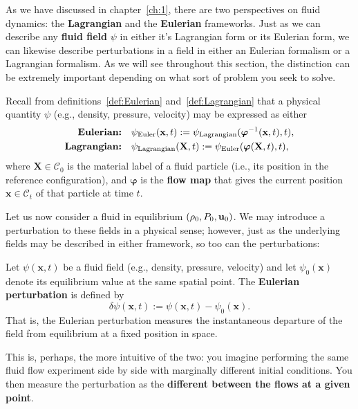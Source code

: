 As we have discussed in chapter~\ref{ch:1}, there are two perspectives on fluid dynamics: the \textbf{Lagrangian} and the \textbf{Eulerian} frameworks. Just as we can describe any \textbf{fluid field} $\psi$ in either it's Lagrangian form or its Eulerian form, we can likewise describe perturbations in a field in either an Eulerian formalism or a Lagrangian formalism. As we will see throughout this section, the distinction can be extremely important depending on what sort of problem you seek to solve.
\par
Recall from definitions~\ref{def:Eulerian} and~\ref{def:Lagrangian} that a physical quantity \( \psi \) (e.g., density, pressure, velocity) may be expressed as either
\[
\begin{aligned}
    \textbf{Eulerian:} \quad & \psi_{\rm Euler}(\mathbf{x}, t) := \psi_{\rm Lagrangian}(\boldsymbol{\varphi}^{-1}({\bf x},t),t), \\
    \textbf{Lagrangian:} \quad & \psi_{\rm Lagrangian}(\mathbf{X}, t) := \psi_{\rm Euler}(\boldsymbol{\varphi}(\mathbf{X}, t), t),
\end{aligned}
\]
where \( \mathbf{X} \in \mathcal{C}_0 \) is the material label of a fluid particle (i.e., its position in the reference configuration), and \( \boldsymbol{\varphi} \) is the \textbf{flow map} that gives the current position \( \mathbf{x} \in \mathcal{C}_t \) of that particle at time \( t \).
\par
Let us now consider a fluid in equilibrium $(\rho_0,P_0, {\bf u}_0)$. We may introduce a perturbation to these fields in a physical sense; however, just as the underlying fields may be described in either framework, so too can the perturbations:
\vspace{0.5cm}
\begin{definition}
Let \( \psi(\mathbf{x},t) \) be a fluid field (e.g., density, pressure, velocity) and let \( \psi_0(\mathbf{x}) \) denote its equilibrium value at the same spatial point.  The \textbf{Eulerian perturbation} is defined by
\[
\delta \psi(\mathbf{x},t) := \psi(\mathbf{x},t) - \psi_0(\mathbf{x}).
\]
That is, the Eulerian perturbation measures the instantaneous departure of the field 
from equilibrium at a fixed position in space.
\par
This is, perhaps, the more intuitive of the two: you imagine performing the same fluid flow experiment side by side with marginally different initial conditions. You then measure the perturbation as the \textbf{different between the flows at a given point}.
\end{definition}
